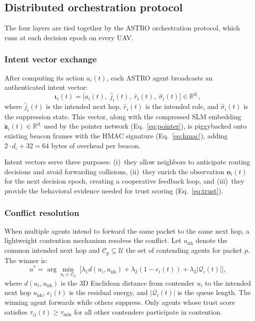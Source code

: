\documentclass[5p,times]{elsarticle}
\begin{document}
\subsection{Distributed orchestration protocol}
\label{subsec:orchestration}

The four layers are tied together by the ASTRO orchestration protocol, which runs at each decision epoch on every UAV.

\subsubsection{Intent vector exchange}

After computing its action $a_i(t)$, each ASTRO agent broadcasts an authenticated intent vector:
\begin{equation}
\label{eq:intent}
\boldsymbol{\iota}_i(t) = \big[a_i(t),\; \hat{j}_i(t),\; \hat{r}_i(t),\; \hat{\sigma}_i(t)\big] \in \mathbb{R}^{d_\iota},
\end{equation}
where $\hat{j}_i(t)$ is the intended next hop, $\hat{r}_i(t)$ is the intended role, and $\hat{\sigma}_i(t)$ is the suppression state. This vector, along with the compressed SLM embedding $\tilde{\mathbf{z}}_i(t) \in \mathbb{R}^{d_\iota}$ used by the pointer network (Eq.~\eqref{eq:pointer}), is piggybacked onto existing beacon frames with the HMAC signature (Eq.~\eqref{eq:hmac}), adding $2 \cdot d_\iota + 32 = 64$ bytes of overhead per beacon.

Intent vectors serve three purposes: (i)~they allow neighbors to anticipate routing decisions and avoid forwarding collisions, (ii)~they enrich the observation $\mathbf{o}_i(t)$ for the next decision epoch, creating a cooperative feedback loop, and (iii)~they provide the behavioral evidence needed for trust scoring (Eq.~\eqref{eq:trust}).

\subsubsection{Conflict resolution}

When multiple agents intend to forward the same packet to the same next hop, a lightweight contention mechanism resolves the conflict. Let $u_{\mathrm{nh}}$ denote the common intended next hop and $\mathcal{C}_p \subseteq \mathcal{U}$ the set of contending agents for packet $p$. The winner is:
\begin{equation}
\label{eq:conflict}
u^* = \arg\min_{u_i \in \mathcal{C}_p} \; \Big[\lambda_1 d(u_i, u_{\mathrm{nh}}) + \lambda_2 (1 - e_i(t)) + \lambda_3 |\mathcal{Q}_i(t)|\Big],
\end{equation}
where $d(u_i, u_{\mathrm{nh}})$ is the 3D Euclidean distance from contender $u_i$ to the intended next hop $u_{\mathrm{nh}}$, $e_i(t)$ is the residual energy, and $|\mathcal{Q}_i(t)|$ is the queue length. The winning agent forwards while others suppress. Only agents whose trust score satisfies $\tau_{ij}(t) \geq \tau_{\min}$ for all other contenders participate in contention.
\end{document}
